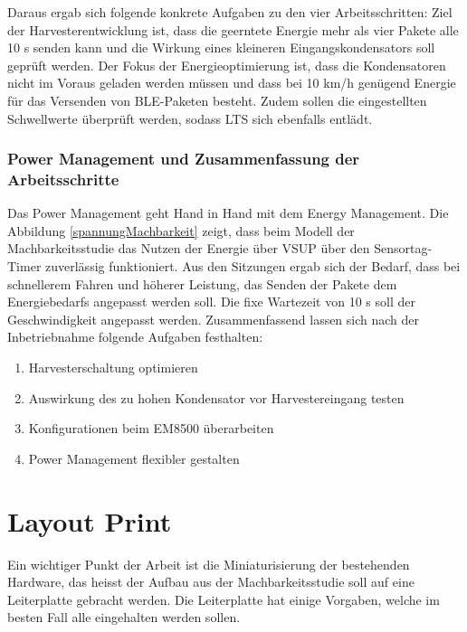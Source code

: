 Daraus ergab sich folgende konkrete Aufgaben zu den vier Arbeitsschritten: Ziel der Harvesterentwicklung ist, dass die geerntete Energie mehr als vier Pakete alle 10 s senden kann und die Wirkung eines kleineren Eingangskondensators soll geprüft werden. Der Fokus der Energieoptimierung ist, dass die Kondensatoren nicht im Voraus geladen werden müssen und dass bei 10 km/h genügend Energie für das Versenden von BLE-Paketen besteht. Zudem sollen die eingestellten Schwellwerte überprüft werden, sodass LTS sich ebenfalls entlädt.


\subsubsection{Power Management und Zusammenfassung der Arbeitsschritte}

Das Power Management geht Hand in Hand mit dem Energy Management. Die Abbildung \ref{spannungMachbarkeit} zeigt, dass beim Modell der Machbarkeitsstudie das Nutzen der Energie über VSUP über den Sensortag-Timer zuverlässig funktioniert. Aus den Sitzungen ergab sich der Bedarf, dass bei schnellerem Fahren und höherer Leistung, das Senden der Pakete dem Energiebedarfs angepasst werden soll. Die fixe Wartezeit von 10 s soll der Geschwindigkeit angepasst werden. Zusammenfassend lassen sich nach der Inbetriebnahme folgende Aufgaben festhalten:

\begin{enumerate}
    \item Harvesterschaltung optimieren
    \item Auswirkung des zu hohen Kondensator vor Harvestereingang testen
    \item Konfigurationen beim EM8500 überarbeiten
    \item Power Management flexibler gestalten
\end{enumerate}


\section{Layout Print}

Ein wichtiger Punkt der Arbeit ist die Miniaturisierung der bestehenden Hardware, das heisst der Aufbau aus der Machbarkeitsstudie soll auf eine Leiterplatte gebracht werden. Die Leiterplatte hat einige Vorgaben, welche im besten Fall alle eingehalten werden sollen.

